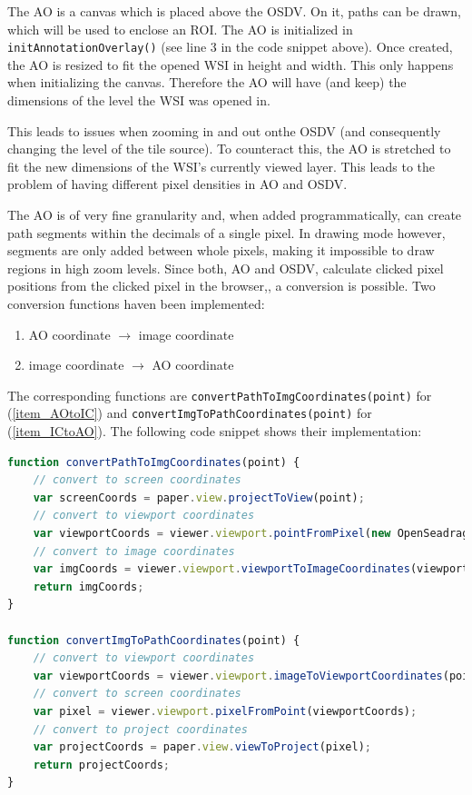 The AO is a canvas which is placed above the OSDV. On it, paths can be drawn, which will be used to enclose an ROI. The AO is initialized in \texttt{initAnnotationOverlay()} (see line 3 in the code snippet above). Once created, the AO is resized to fit the opened WSI in height and width. This only happens when initializing the canvas. Therefore the AO will have (and keep) the dimensions of the level the WSI was opened in.

This leads to issues when zooming in and out onthe OSDV (and consequently changing the level of the tile source). To counteract this, the AO is stretched to fit the new dimensions of the WSI's currently viewed layer. This leads to the problem of having different pixel densities in AO and OSDV.

The AO is of very fine granularity and, when added programmatically, can create path segments within the decimals of a single pixel\cite{web:paper}. In drawing mode however, segments are only added between whole pixels, making it impossible to draw regions in high zoom levels. Since both, AO and OSDV, calculate clicked pixel positions from the clicked pixel in the browser\cite{web:openseadragon},\cite{web:paper}, a conversion is possible. Two conversion functions haven been implemented:
\begin{enumerate}[(1)]
	\item\label{item_AOtoIC} AO coordinate $\rightarrow$ image coordinate
	\item\label{item_ICtoAO} image coordinate $\rightarrow$ AO coordinate
\end{enumerate}

The corresponding functions are \texttt{convertPathToImgCoordinates(point)} for (\ref{item_AOtoIC}) and \texttt{convertImgToPathCoordinates(point)} for (\ref{item_ICtoAO}). The following code snippet shows their implementation:

\begin{lstlisting}[title=as{\textunderscore}viewer.js, frame=single, language=JavaScript]
function convertPathToImgCoordinates(point) {
	// convert to screen coordinates
	var screenCoords = paper.view.projectToView(point);
	// convert to viewport coordinates
	var viewportCoords = viewer.viewport.pointFromPixel(new OpenSeadragon.Point(screenCoords.x, screenCoords.y));
	// convert to image coordinates
	var imgCoords = viewer.viewport.viewportToImageCoordinates(viewportCoords);
	return imgCoords;
}

function convertImgToPathCoordinates(point) {
	// convert to viewport coordinates
	var viewportCoords = viewer.viewport.imageToViewportCoordinates(point);
	// convert to screen coordinates
	var pixel = viewer.viewport.pixelFromPoint(viewportCoords);
	// convert to project coordinates
	var projectCoords = paper.view.viewToProject(pixel);
	return projectCoords;
}
\end{lstlisting}

